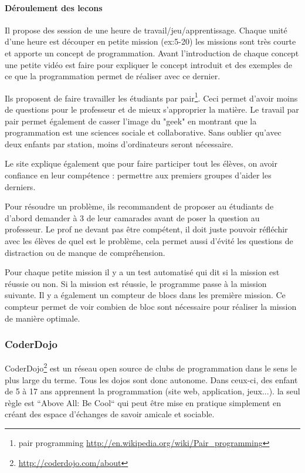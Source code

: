 \paragraph{Déroulement des lecons}
Il propose des session de une heure de travail/jeu/apprentissage. Chaque unité d'une heure est découper en petite mission (ex:5-20) les missions sont très courte et apporte un concept de programmation. Avant l'introduction de chaque concept une petite vidéo est faire pour expliquer le concept introduit et des exemples de ce que la programmation permet de réaliser avec ce dernier.

Ils proposent de faire travailler les étudiants par pair\footnote{pair programming \url{http://en.wikipedia.org/wiki/Pair\_programming}}. Ceci permet d'avoir moins de questions pour le professeur et de mieux s'approprier la matière. Le travail par pair permet également de casser l'image du "geek" en montrant que la programmation est une sciences sociale et collaborative. Sans oublier qu'avec deux enfants par station, moins d'ordinateurs seront nécessaire.

Le site explique également que pour faire participer tout les élèves, on avoir confiance en leur compétence : permettre aux premiers groupes d'aider les derniers.

Pour résoudre un problème, ils recommandent de proposer au étudiants de d'abord demander à 3 de leur camarades avant de poser la question au professeur. Le prof ne devant pas être compétent, il doit juste pouvoir réfléchir avec les élèves de quel est le problème, cela permet aussi d'évité les questions de distraction ou de manque de compréhension.

Pour chaque petite mission il y a un test automatisé qui dit si la mission est réussie ou non. Si la mission est réussie, le programme passe à la mission suivante. Il y a également un compteur de blocs dans les première mission. Ce compteur permet de voir combien de bloc sont nécessaire pour réaliser la mission de manière optimale.

\subsubsection{CoderDojo}
CoderDojo\footnote{\url{http://coderdojo.com/about}} est un réseau open source de clubs de programmation dans le sens le plus large du terme. Tous les dojos sont donc autonome.  Dans ceux-ci, des enfant de 5 à 17 ans apprennent la programmation (site web, application, jeux...). la seul règle est  “Above All: Be Cool“ qui peut être mise en pratique simplement en créant des espace d'échanges de savoir amicale et sociable.

